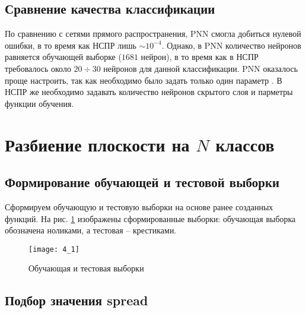 \subsection{Сравнение качества классификации}


По сравнению с сетями прямого распространения, PNN смогла добиться нулевой ошибки, в то время как НСПР лишь $\sim 10^{-4}$. Однако, в PNN количество нейронов равняется обучающей выборке ($1681$ нейрон), в то время как в НСПР требовалось около $20 \div 30$ нейронов для данной классификации. PNN оказалось проще настроить, так как необходимо было задать только один параметр . В НСПР же необходимо задавать количество нейронов скрытого слоя и парметры функции обучения.

\section{Разбиение плоскости на $N$ классов}

\subsection{Формирование обучающей и тестовой выборки}

Сформируем обучающую и тестовую выборки на основе ранее созданных функций. На рис. \ref{fig:4_1} изображены сформированные выборки: обучающая выборка обозначена ноликами, а тестовая -- крестиками.
\begin{figure}[H]
\begin{center}
	\texttt{[image: 4\_1]}
	\caption{Обучающая и тестовая выборки}
	\label{fig:4_1}
\end{center}
\end{figure}

\subsection{Подбор значения spread}


